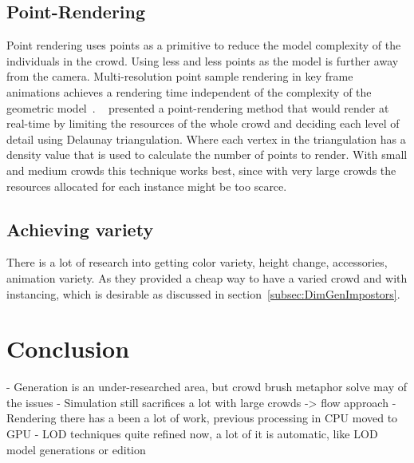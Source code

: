 \documentclass[11pt,twocolumn]{article}
\numberwithin{equation}{section} %
\numberwithin{figure}{section} %
\numberwithin{table}{section} %
\begin{document}
\subsection{Point-Rendering}

Point rendering uses points as a primitive to reduce the model complexity of the individuals in the crowd.
Using less and less points as the model is further away from the camera.
Multi-resolution point sample rendering in key frame animations achieves a rendering time independent of the complexity of the geometric model~\cite{Wand2002}.
~\cite{Larkin2010} presented a point-rendering method that would render at real-time by limiting the resources of the whole crowd and deciding each level of detail using Delaunay triangulation. 
Where each vertex in the triangulation has a density value that is used to calculate the number of points to render.
With small and medium crowds this technique works best, since with very large crowds the resources allocated for each instance might be too scarce.

\subsection{Achieving variety}

There is a lot of research into getting color variety, height change, accessories, animation variety.
As they provided a cheap way to have a varied crowd and with instancing, which is desirable as discussed in section~\ref{subsec:DimGenImpostors}.

\section{Conclusion}

- Generation is an under-researched area, but crowd brush metaphor solve may of the issues
- Simulation still sacrifices a lot with large crowds -> flow approach
- Rendering there has a been a lot of work, previous processing in CPU moved to GPU
- LOD techniques quite refined now, a lot of it is automatic, like LOD model generations or edition

%


\end{document}
